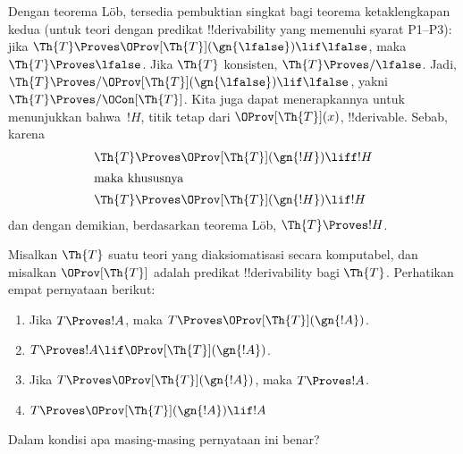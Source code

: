 \documentclass[../../../include/open-logic-section]{subfiles}
\begin{document}
Dengan teorema L\"ob, tersedia pembuktian singkat bagi teorema
ketaklengkapan kedua (untuk teori dengan predikat !!{derivability} yang
memenuhi syarat P1--P3): jika
$\Th{T} \Proves \OProv[\Th{T}](\gn{\lfalse}) \lif \lfalse$, maka
$\Th{T} \Proves \lfalse$. Jika $\Th{T}$ konsisten,
$\Th{T} \Proves/ \lfalse$. Jadi,
$\Th{T} \Proves/ \OProv[\Th{T}](\gn{\lfalse}) \lif \lfalse$, yakni
$\Th{T} \Proves/ \OCon[\Th{T}]$. Kita juga dapat menerapkannya untuk
menunjukkan bahwa~$!H$, titik tetap dari $\OProv[\Th{T}](x)$,
!!{derivable}. Sebab, karena
\begin{align*}
  \Th{T} & \Proves \OProv[\Th{T}](\gn{!H}) \liff !H\\
  \intertext{maka khususnya}
    \Th{T} & \Proves \OProv[\Th{T}](\gn{!H}) \lif !H
\end{align*}
dan dengan demikian, berdasarkan teorema L\"ob, $\Th{T} \Proves !H$.


\begin{prob}
Misalkan $\Th{T}$ suatu teori yang diaksiomatisasi secara komputabel, dan
misalkan $\OProv[\Th{T}]$ adalah predikat !!{derivability} bagi $\Th{T}$.
Perhatikan empat pernyataan berikut:
\begin{enumerate}
\item Jika $T \Proves !A$, maka $T \Proves \OProv[\Th{T}](\gn{!A})$.
\item $T \Proves !A \lif \OProv[\Th{T}](\gn{!A})$.
\item Jika $T \Proves \OProv[\Th{T}](\gn{!A})$, maka $T \Proves !A$.
\item $T \Proves \OProv[\Th{T}](\gn{!A}) \lif !A$
\end{enumerate}
Dalam kondisi apa masing-masing pernyataan ini benar?
\end{prob}
\end{document}
